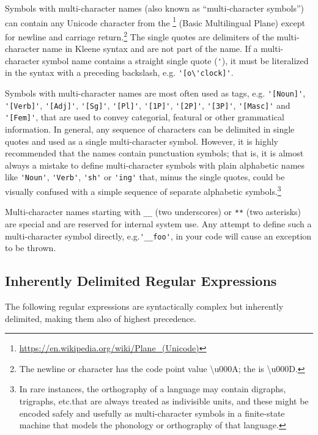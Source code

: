\vspace{.5cm}

\noindent
Symbols with multi-character names (also known as ``multi-character symbols'') can contain any
Unicode character from the
\footnote{\url{https://en.wikipedia.org/wiki/Plane_(Unicode)}} (Basic Multilingual Plane) except for newline and
carriage return.\footnote{The newline or  character has the code
point value \textbackslash{}u000A; the  is \textbackslash{}u000D.}  The
single quotes are delimiters of the multi-character 
name in Kleene syntax and are not part of the name.  If a
multi-character symbol name contains a straight single quote
(\verb!'!), it must be literalized in the syntax with a preceding backslash, e.g.\@
\verb!'[o\'clock]'!.

Symbols with multi-character names are most often used as tags, e.g.\@
\verb!'[Noun]'!, \verb!'[Verb]'!, \verb!'[Adj]'!, \verb!'[Sg]'!,
\verb!'[Pl]'!, \verb!'[1P]'!, \verb!'[2P]'!, \verb!'[3P]'!,
\verb!'[Masc]'! and \verb!'[Fem]'!, that are used to convey categorial,
featural or other grammatical information.  In general, any sequence of
 characters can be delimited in single quotes and used as a
single multi-character symbol.  However, it is highly recommended that
the names contain punctuation symbols; that is, it is almost always a
mistake to define multi-character symbols with plain alphabetic names
like \verb!'Noun'!, \verb!'Verb'!, \verb!'sh'! or \verb!'ing'! that, 
minus the single quotes, could be visually confused with a simple
sequence of separate alphabetic symbols.\footnote{In rare instances, the
orthography of a language may contain digraphs, trigraphs, etc.\@ that
are always treated as indivisible units, and these might be encoded
safely and usefully as multi-character symbols in a finite-state machine
that models the phonology or orthography of that language.}

Multi-character names starting with \verb!__! (two underscores) or
\verb!**! (two asterisks) are special and are reserved for internal
system use.  Any attempt to define such a multi-character symbol
directly, e.g.\@ \verb!'__foo'!, in your code will cause an exception to be
thrown.

\subsection{Inherently Delimited Regular Expressions}

The following regular expressions are syntactically complex but
inherently delimited, making them also of highest precedence.

